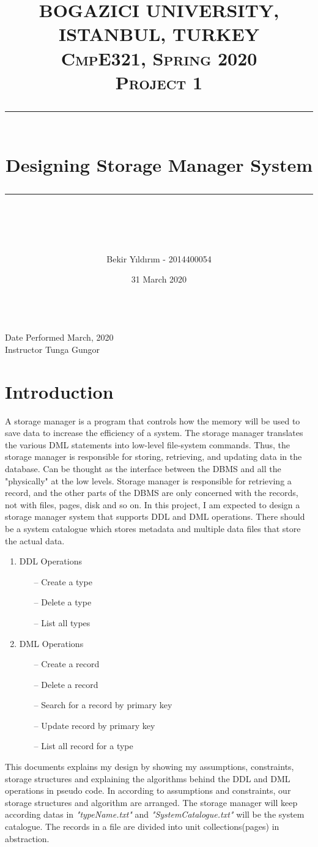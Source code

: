 \documentclass{article}
\title{
\normalfont \normalsize 
\textsc{BOGAZICI UNIVERSITY, ISTANBUL, TURKEY \\ 
CmpE321, Spring 2020} \\
[10pt]
\textsc{\Large Project 1}
\rule{\linewidth}{0.5pt} \\[15pt] 
\huge Designing Storage Manager System \\
\rule{\linewidth}{2pt}  \\[30pt]
}
\author{Bekir Yıldırım - 2014400054}
\date{\normalsize 31 March 2020}
\newcounter{other}
\newcounter{late}
\begin{document}
\maketitle
\noindent
\textsc{} \\
[270pt]
Date Performed  March, 2020 \\
Instructor \dotfill Tunga Gungor \\

\tableofcontents{}

\break

\section{Introduction}
    A storage manager is a program that controls how the memory will be used to save data to increase the efficiency of a system. The storage manager translates the various DML statements into low-level file-system commands. Thus, the storage manager is responsible for storing, retrieving, and updating data in the database. Can be thought as the interface between the DBMS and all the "physically" at the low levels. Storage manager is responsible for retrieving a record, and the other parts of the DBMS are only concerned with the records, not with files, pages, disk and so on. In this project, I am expected to design a storage manager system that supports DDL and DML operations. There should be a system catalogue which stores metadata and multiple data files that store the actual data. 
    \begin{enumerate}
	\item DDL Operations
    \begin{enumerate}
    	\item[--] Create a type
        \item[--] Delete a type
        \item[--] List all types
    \end{enumerate}
    \item DML Operations
    \begin{enumerate}
    	\item[--] Create a record
        \item[--] Delete a record
        \item[--] Search for a record by primary key
        \item[--] Update record by primary key
        \item[--] List all record for a type
    \end{enumerate}
\end{enumerate}
This documents explains my design by showing my assumptions, constraints, storage structures and explaining the algorithms behind the DDL and DML operations in pseudo code. In according to assumptions and constraints, our storage structures and algorithm are arranged. The storage manager will keep according datas in \emph{"typeName.txt"} and \emph{"SystemCatalogue.txt"} will be the system catalogue. The records in a file are divided into unit collections(pages) in abstraction.
    
\end{document}
